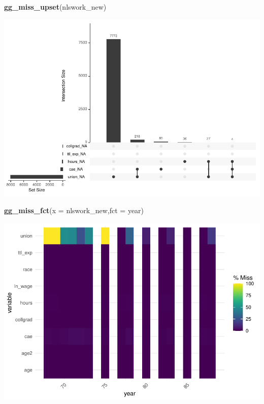 \documentclass[
]{article}
\newenvironment{Shaded}{\begin{snugshade}}{\end{snugshade}}
\newcommand{\AttributeTok}[1]{\textcolor[rgb]{0.13,0.29,0.53}{#1}}
\newcommand{\FunctionTok}[1]{\textcolor[rgb]{0.13,0.29,0.53}{\textbf{#1}}}
\newcommand{\NormalTok}[1]{#1}
\begin{document}
\begin{Shaded}
\begin{Highlighting}[]
\FunctionTok{gg\_miss\_upset}\NormalTok{(nlswork\_new)}
\end{Highlighting}
\end{Shaded}

\includegraphics{RIntro_files/figure-latex/unnamed-chunk-8-2.pdf}

\begin{Shaded}
\begin{Highlighting}[]
\FunctionTok{gg\_miss\_fct}\NormalTok{(}\AttributeTok{x =}\NormalTok{ nlswork\_new,}\AttributeTok{fct =}\NormalTok{ year)}
\end{Highlighting}
\end{Shaded}

\includegraphics{RIntro_files/figure-latex/unnamed-chunk-9-1.pdf}
\end{document}
